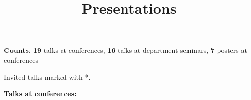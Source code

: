 \documentclass[11pt,letterpaper,sans]{moderncv}   %
\title{Presentations}
\begin{document}
\pagestyle{headonly}

\maketitle




\textcolor{color1}{\textbf{Counts:}} {\textbf{19} talks at conferences}, {\textbf{16} talks at department seminars}, {\textbf{7} posters at conferences}

\vspace{0.2cm}
Invited talks marked with *.
\vspace{0.5cm}

\textcolor{color1}{\textbf{Talks at conferences:}}
\vspace{-0.5cm}
\end{document}
